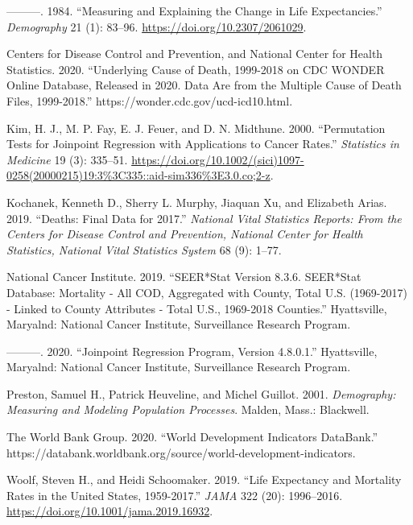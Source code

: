 \documentclass[
  11pt,
]{article}
\begin{document}
\leavevmode\hypertarget{ref-arriaga1984}{}%
---------. 1984. ``Measuring and Explaining the Change in Life
Expectancies.'' \emph{Demography} 21 (1): 83--96.
\url{https://doi.org/10.2307/2061029}.

\leavevmode\hypertarget{ref-wonder2020}{}%
Centers for Disease Control and Prevention, and National Center for
Health Statistics. 2020. ``Underlying Cause of Death, 1999-2018 on CDC
WONDER Online Database, Released in 2020. Data Are from the Multiple
Cause of Death Files, 1999-2018.''
https://wonder.cdc.gov/ucd-icd10.html.

\leavevmode\hypertarget{ref-kim2000}{}%
Kim, H. J., M. P. Fay, E. J. Feuer, and D. N. Midthune. 2000.
``Permutation Tests for Joinpoint Regression with Applications to Cancer
Rates.'' \emph{Statistics in Medicine} 19 (3): 335--51.
\url{https://doi.org/10.1002/(sici)1097-0258(20000215)19:3\%3C335::aid-sim336\%3E3.0.co;2-z}.

\leavevmode\hypertarget{ref-kochanek2019}{}%
Kochanek, Kenneth D., Sherry L. Murphy, Jiaquan Xu, and Elizabeth Arias.
2019. ``Deaths: Final Data for 2017.'' \emph{National Vital Statistics
Reports: From the Centers for Disease Control and Prevention, National
Center for Health Statistics, National Vital Statistics System} 68 (9):
1--77.

\leavevmode\hypertarget{ref-nci2019}{}%
National Cancer Institute. 2019. ``SEER*Stat Version 8.3.6. SEER*Stat
Database: Mortality - All COD, Aggregated with County, Total U.S.
(1969-2017) - Linked to County Attributes - Total U.S., 1969-2018
Counties.'' Hyattsville, Maryalnd: National Cancer Institute,
Surveillance Research Program.

\leavevmode\hypertarget{ref-nci2020}{}%
---------. 2020. ``Joinpoint Regression Program, Version 4.8.0.1.''
Hyattsville, Maryalnd: National Cancer Institute, Surveillance Research
Program.

\leavevmode\hypertarget{ref-preston2001}{}%
Preston, Samuel H., Patrick Heuveline, and Michel Guillot. 2001.
\emph{Demography: Measuring and Modeling Population Processes}. Malden,
Mass.: Blackwell.

\leavevmode\hypertarget{ref-theworldbankgroup2020}{}%
The World Bank Group. 2020. ``World Development Indicators \textbar{}
DataBank.''
https://databank.worldbank.org/source/world-development-indicators.

\leavevmode\hypertarget{ref-woolf2019}{}%
Woolf, Steven H., and Heidi Schoomaker. 2019. ``Life Expectancy and
Mortality Rates in the United States, 1959-2017.'' \emph{JAMA} 322 (20):
1996--2016. \url{https://doi.org/10.1001/jama.2019.16932}.
\end{document}
